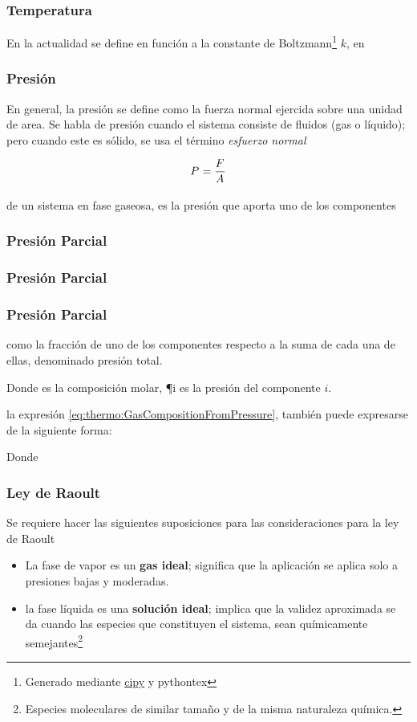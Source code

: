 \subsubsection{Temperatura}
En la actualidad se define en función a la constante de Boltzmann\footnote{Generado mediante \href{https://docs.scipy.org/doc/scipy/reference/constants.html}{cipy} y pythontex} {$k$},  en
\subsubsection{Presión}
En general, la presión se define como la fuerza normal ejercida sobre una unidad de area. Se habla de presión cuando el sistema consiste de fluidos (gas o líquido); pero cuando este es sólido, se usa el término \textit{esfuerzo normal} \textcite{YunusA.Cengel2015}

\begin{equation}
   P_{}^{} = \frac{{F}_{}^{}}{{A}_{}^{}} 
\end{equation}

\figMolecularColissions

de un sistema en fase gaseosa, es la presión que aporta uno de los componentes


\subsubsection{Presión Parcial}
\subsubsection{Presión Parcial}

\subsubsection{Presión Parcial}
como la fracción de uno de los componentes respecto a la suma de cada una de ellas, denominado presión total.

\eqGasCompositionFromPressure
Donde  es la composición molar, {\P{i}} es la presión del componente {${i}$}.

la expresión \eqref{eq:thermo:GasCompositionFromPressure}, también puede expresarse de la siguiente forma:

\eqGasCompositionFromTotalPressure
Donde

\subsubsection*{Ley de Raoult}
Se requiere hacer las siguientes suposiciones para las consideraciones para la ley de Raoult \parencite{Smith.VanNess.Abbott2007}
\begin{itemize}
  \item La fase de vapor es un \textbf{gas ideal}; significa que la aplicación se aplica solo a presiones bajas y moderadas.
  \item la fase líquida es una \textbf{solución ideal}; implica que la validez aproximada se da cuando las especies que constituyen el sistema, sean químicamente semejantes\footnote{Especies moleculares de similar tamaño y de la misma naturaleza química.}
\end{itemize}

